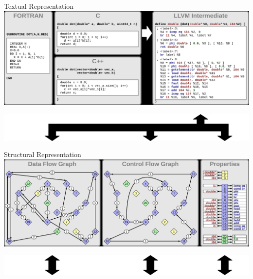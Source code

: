 \centering
\begin{blackbox}{Textual Representation}
\includegraphics[width=\columnwidth]{figures/model_representations_textual}
\end{blackbox}

\includegraphics[width=\columnwidth]{figures/model_arrows_upper}

\begin{blackbox}{Structural Representation}
\includegraphics[width=\columnwidth]{figures/model_representations_structure}
\end{blackbox}

\includegraphics[width=\columnwidth]{figures/model_arrows_lower}

